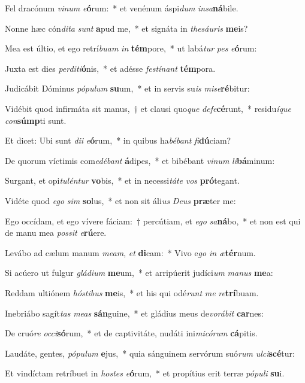 \item Fel dracónum \textit{vi}\textit{num} \textit{e}\textbf{ó}rum:~* et venénum áspi\textit{dum} \textit{in}\textit{sa}\textbf{ná}bile.
\item Nonne hæc cón\textit{di}\textit{ta} \textit{sunt} \textbf{a}pud me,~* et signáta in \textit{the}\textit{sáu}\textit{ris} \textbf{me}is?
\item Mea est últio, et ego retrí\textit{bu}\textit{am} \textit{in} \textbf{tém}pore,~* ut labá\textit{tur} \textit{pes} \textit{e}\textbf{ó}rum:
\item Juxta est dies \textit{per}\textit{di}\textit{ti}\textbf{ó}nis,~* et adésse \textit{fes}\textit{tí}\textit{nant} \textbf{tém}pora.
\item Judicábit Dóminus \textit{pó}\textit{pu}\textit{lum} \textbf{su}um,~* et in servis su\textit{is} \textit{mi}\textit{se}\textbf{ré}bitur:
\item Vidébit quod infirmáta sit manus,~† et clausi quo\textit{que} \textit{de}\textit{fe}\textbf{cé}runt,~* residu\textit{í}\textit{que} \textit{con}\textbf{súmp}ti sunt.
\item Et dicet: Ubi sunt \textit{di}\textit{i} \textit{e}\textbf{ó}rum,~* in quibus ha\textit{bé}\textit{bant} \textit{fi}\textbf{dú}ciam?
\item De quorum víctimis com\textit{e}\textit{dé}\textit{bant} \textbf{á}dipes,~* et bibébant \textit{vi}\textit{num} \textit{li}\textbf{bá}minum:
\item Surgant, et opi\textit{tu}\textit{lén}\textit{tur} \textbf{vo}bis,~* et in necessi\textit{tá}\textit{te} \textit{vos} \textbf{pró}tegant.
\item Vidéte quod \textit{e}\textit{go} \textit{sim} \textbf{so}lus,~* et non sit áli\textit{us} \textit{De}\textit{us} \textbf{præ}ter me:
\item Ego occídam, et ego vívere fáciam:~† percútiam, et \textit{e}\textit{go} \textit{sa}\textbf{ná}bo,~* et non est qui de manu mea \textit{pos}\textit{sit} \textit{e}\textbf{rú}ere.
\item Levábo ad cælum manum \textit{me}\textit{am}, \textit{et} \textbf{di}cam:~* Vivo e\textit{go} \textit{in} \textit{æ}\textbf{tér}num.
\item Si acúero ut fulgur \textit{glá}\textit{di}\textit{um} \textbf{me}um,~* et arripúerit judíci\textit{um} \textit{ma}\textit{nus} \textbf{me}a:
\item Reddam ultiónem \textit{hós}\textit{ti}\textit{bus} \textbf{me}is,~* et his qui odé\textit{runt} \textit{me} \textit{re}\textbf{trí}buam.
\item Inebriábo sagít\textit{tas} \textit{me}\textit{as} \textbf{sán}guine,~* et gládius meus de\textit{vo}\textit{rá}\textit{bit} \textbf{car}nes:
\item De cruó\textit{re} \textit{oc}\textit{ci}\textbf{só}rum,~* et de captivitáte, nudáti ini\textit{mi}\textit{có}\textit{rum} \textbf{cá}pitis.
\item Laudáte, gentes, \textit{pó}\textit{pu}\textit{lum} \textbf{e}jus,~* quia sánguinem servórum suó\textit{rum} \textit{ul}\textit{ci}\textbf{scé}tur:
\item Et vindíctam retríbuet in \textit{hos}\textit{tes} \textit{e}\textbf{ó}rum,~* et propítius erit terræ \textit{pó}\textit{pu}\textit{li} \textbf{su}i.
